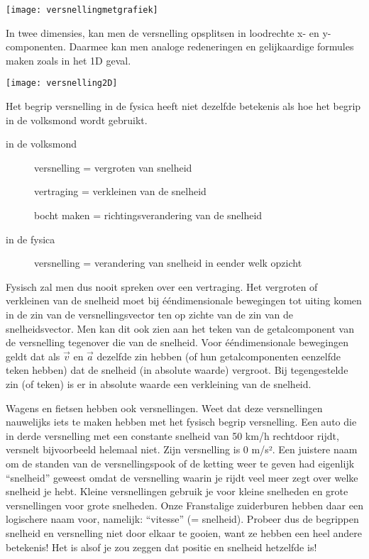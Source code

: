 \documentclass{ximera}
\begin{document}
\begin{image}
\texttt{[image: versnellingmetgrafiek]}
\end{image}

In twee dimensies, kan men de versnelling opsplitsen in loodrechte x- en y-componenten. Daarmee kan men analoge redeneringen en gelijkaardige formules maken zoals in het 1D geval.

\begin{image}
\texttt{[image: versnelling2D]}

\end{image}

\begin{remark}
	Het begrip versnelling in de fysica heeft niet dezelfde betekenis als hoe het begrip in de volksmond wordt gebruikt.
	\begin{description}
		\item[in de volksmond] 
			\begin{itemize}
				versnelling = vergroten van snelheid

				vertraging = verkleinen van de snelheid

				bocht maken = richtingsverandering van de snelheid
			\end{itemize}
		\item[in de fysica]
			versnelling = verandering van snelheid in eender welk opzicht
	\end{description}

	Fysisch zal men dus nooit spreken over een vertraging. Het vergroten of verkleinen van de snelheid moet bij ééndimensionale bewegingen tot uiting komen in de zin van de versnellingsvector ten op zichte van de zin van de snelheidsvector. Men kan dit ook zien aan het teken van de getalcomponent van de versnelling tegenover die van de snelheid.
	Voor ééndimensionale bewegingen geldt dat als \(\vec{v}\) en \(\vec{a}\) dezelfde zin hebben (of hun getalcomponenten eenzelfde teken hebben) dat de snelheid (in absolute waarde) vergroot. Bij tegengestelde zin (of teken) is er in absolute waarde een verkleining van de snelheid.

\end{remark}

\begin{remark}

	Wagens en fietsen hebben ook versnellingen. Weet dat deze versnellingen nauwelijks iets te maken hebben met het fysisch begrip versnelling. Een auto die in derde versnelling met een constante snelheid van 50 km/h rechtdoor rijdt, versnelt bijvoorbeeld helemaal niet. Zijn versnelling is 0 m/s². Een juistere naam om de standen van de versnellingspook of de ketting weer te geven had eigenlijk “snelheid” geweest omdat de versnelling waarin je rijdt veel meer zegt over welke snelheid je hebt. Kleine versnellingen gebruik je voor kleine snelheden en grote versnellingen voor grote snelheden. Onze Franstalige zuiderburen hebben daar een logischere naam voor, namelijk: “vitesse” (= snelheid). Probeer dus de begrippen snelheid en versnelling niet door elkaar te gooien, want ze hebben een heel andere betekenis! Het is alsof je zou zeggen dat positie en snelheid hetzelfde is!


\end{remark}
\end{document}
